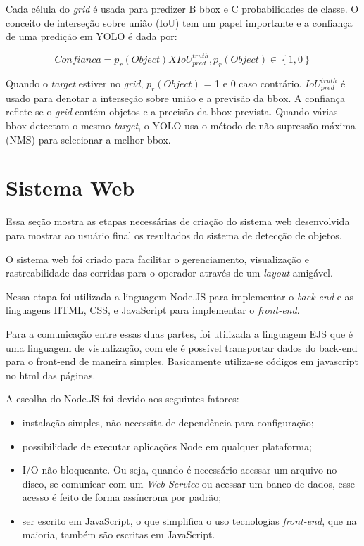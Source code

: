 Cada célula do  \textit{grid} é usada para predizer B bbox e C probabilidades de classe. O conceito de interseção sobre união (IoU) tem um papel importante e a confiança de uma predição em YOLO é dada por:

\begin{equation}
    Confianca = p_r(Object) X IoU_{pred}^{truth} , p_r(Object) \in \left \{ 1\right.,\left.0\right \}
\end{equation}

Quando o \textit{target} estiver no \textit{grid}, \(p_r(Object)\) = 1 e 0 caso contrário. \(IoU_{pred}^{truth}\) é usado para denotar a interseção sobre união e a previsão da bbox. 
A confiança reflete se o \textit{grid} contém objetos e a precisão da bbox prevista. Quando várias bbox detectam o mesmo \textit{target}, o YOLO usa o método de não supressão máxima (NMS) para selecionar a melhor bbox.


\section{Sistema Web} \label{sec:web}

Essa seção mostra as etapas necessárias de criação do sistema web desenvolvida para mostrar ao usuário final os resultados do sistema de detecção de objetos.

O sistema web foi criado para facilitar o gerenciamento, visualização e rastreabilidade das corridas para o operador através de um \textit{layout} amigável.

Nessa etapa foi utilizada a linguagem Node.JS para implementar o \textit{back-end} e as linguagens HTML, CSS,  e JavaScript para implementar o \textit{front-end}. 

Para a comunicação entre essas duas partes, foi utilizada a linguagem EJS que é uma linguagem de visualização, com ele é possível transportar dados do back-end para o front-end de maneira simples. Basicamente utiliza-se códigos em javascript no html das páginas. 

A escolha do Node.JS foi devido aos seguintes fatores:

\begin{itemize}
    \item instalação simples, não necessita de dependência para configuração;
    \item possibilidade de executar aplicações Node em qualquer plataforma;
    \item I/O não bloqueante. Ou seja, quando é necessário acessar um arquivo no disco, se comunicar com um \textit{Web Service} ou acessar um banco de dados, esse acesso é feito de forma assíncrona por padrão;
    \item ser escrito em JavaScript, o que simplifica o uso tecnologias \textit{front-end}, que na maioria, também são escritas em JavaScript.
\end{itemize}
 
